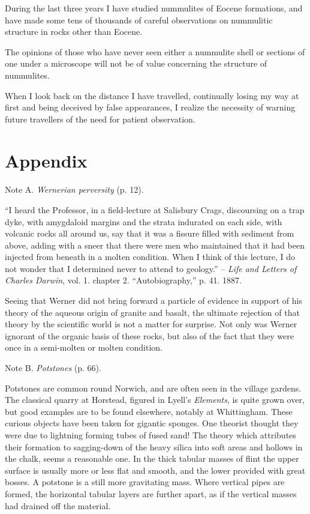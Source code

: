 \documentclass[a4paper, 12pt, oneside]{article}
\begin{document}
During the last three years I have studied nummulites of Eocene formations, and have made some tens of thousands of careful observations on nummulitic structure in rocks other than Eocene.

The opinions of those who have never seen either a nummulite shell or sections of one under a microscope will not be of value concerning the structure of nummulites.

When I look back on the distance I have travelled, continually losing my way at first and being deceived by false appearances, I realize the necessity of warning future travellers of the need for patient observation.
\clearpage
\section{Appendix}
\paragraph{}
Note A. \emph{Wernerian perversity} (p. 12).

``I heard the Professor, in a field-lecture at Salisbury Crags, discoursing on a trap dyke, with amygdaloid margins and the strata indurated on each side, with volcanic rocks all around us, say that it was a fissure filled with sediment from above, adding with a sneer that there were men who maintained that it had been injected from beneath in a molten condition. When I think of this lecture, I do not wonder that I determined never to attend to geology.'' -- \emph{Life and Letters of Charles Darwin}, vol. 1. chapter 2. ``Autobiography,'' p. 41. 1887.

Seeing that Werner did not bring forward a particle of evidence in support of his theory of the aqueous origin of granite and basalt, the ultimate rejection of that theory by the scientific world is not a matter for surprise. Not only was Werner ignorant of the organic basis of these rocks, but also of the fact that they were once in a semi-molten or molten condition.

Note B. \emph{Potstones} (p. 66).

Potstones are common round Norwich, and are often seen in the village gardens. The classical quarry at Horstead, figured in Lyell's \emph{Elements}, is quite grown over, but good examples are to be found elsewhere, notably at Whittingham. These curious objects have been taken for gigantic sponges. One theorist thought they were due to lightning forming tubes of fused sand! The theory which attributes their formation to sagging-down of the heavy silica into soft areas and hollows in the chalk, seems a reasonable one. In the thick tabular masses of flint the upper surface is usually more or less flat and smooth, and the lower provided with great bosses. A potstone is a still more gravitating mass. Where vertical pipes are formed, the horizontal tabular layers are further apart, as if the vertical masses had drained off the material.
\end{document}
